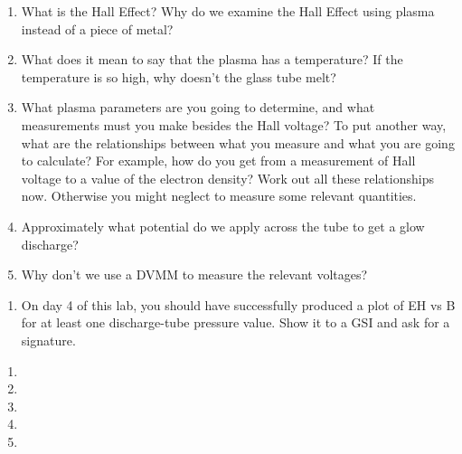 \documentclass{../signatures}
\begin{document}
\maketitle

\names

\prelab

\begin{enumerate}

    \item What is the Hall Effect? Why do we examine the Hall Effect using plasma instead of a piece of metal?
    
    \item What does it mean to say that the plasma has a temperature? If the temperature is so high, why doesn’t the glass tube melt?

    \item What plasma parameters are you going to determine, and what measurements must you make besides the Hall voltage? To put another way, what are the relationships between what you measure and what you are going to calculate? For example, how do you get from a measurement of Hall voltage to a value of the electron density? Work out all these relationships now. Otherwise you might neglect to measure some relevant quantities.

    \item Approximately what potential do we apply across the tube to get a glow discharge?

    \item Why don’t we use a DVMM to measure the relevant voltages?
       \\[36pt]
\end{enumerate}

\prelabsignatures

\midlab

\begin{enumerate}

    \item On day 4 of this lab, you should have successfully produced a plot of EH vs B for at least one discharge-tube pressure value. Show it to a GSI and ask for a signature.
\\[36pt]
\end{enumerate}


\checkpointsection 

\begin{enumerate}

\item {}

\item {}

\item {}

\item {}

\item {}

\end{enumerate}
\end{document}
